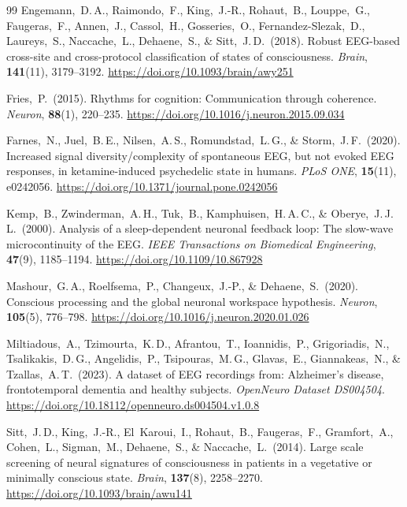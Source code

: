 \documentclass[11pt,a4paper]{article}
\theoremstyle{plain}
\theoremstyle{definition}
\theoremstyle{remark}
\begin{document}
\begin{thebibliography}{99}
Engemann,~D.\,A., Raimondo,~F., King,~J.-R., Rohaut,~B., Louppe,~G., Faugeras,~F., Annen,~J., Cassol,~H., Gosseries,~O., Fernandez-Slezak,~D., Laureys,~S., Naccache,~L., Dehaene,~S., \& Sitt,~J.\,D.\ (2018).
Robust EEG-based cross-site and cross-protocol classification of states of consciousness.
\textit{Brain}, \textbf{141}(11), 3179--3192.
\url{https://doi.org/10.1093/brain/awy251}

Fries,~P.\ (2015).
Rhythms for cognition: Communication through coherence.
\textit{Neuron}, \textbf{88}(1), 220--235.
\url{https://doi.org/10.1016/j.neuron.2015.09.034}

Farnes,~N., Juel,~B.\,E., Nilsen,~A.\,S., Romundstad,~L.\,G., \& Storm,~J.\,F.\ (2020).
Increased signal diversity/complexity of spontaneous EEG, but not evoked EEG responses, in ketamine-induced psychedelic state in humans.
\textit{PLoS ONE}, \textbf{15}(11), e0242056.
\url{https://doi.org/10.1371/journal.pone.0242056}


Kemp,~B., Zwinderman,~A.\,H., Tuk,~B., Kamphuisen,~H.\,A.\,C., \& Oberye,~J.\,J.\,L.\ (2000).
Analysis of a sleep-dependent neuronal feedback loop: The slow-wave microcontinuity of the EEG.
\textit{IEEE Transactions on Biomedical Engineering}, \textbf{47}(9), 1185--1194.
\url{https://doi.org/10.1109/10.867928}

Mashour,~G.\,A., Roelfsema,~P., Changeux,~J.-P., \& Dehaene,~S.\ (2020).
Conscious processing and the global neuronal workspace hypothesis.
\textit{Neuron}, \textbf{105}(5), 776--798.
\url{https://doi.org/10.1016/j.neuron.2020.01.026}

Miltiadous,~A., Tzimourta,~K.\,D., Afrantou,~T., Ioannidis,~P., Grigoriadis,~N., Tsalikakis,~D.\,G., Angelidis,~P., Tsipouras,~M.\,G., Glavas,~E., Giannakeas,~N., \& Tzallas,~A.\,T.\ (2023).
A dataset of EEG recordings from: Alzheimer's disease, frontotemporal dementia and healthy subjects.
\textit{OpenNeuro Dataset DS004504}.
\url{https://doi.org/10.18112/openneuro.ds004504.v1.0.8}


Sitt,~J.\,D., King,~J.-R., El~Karoui,~I., Rohaut,~B., Faugeras,~F., Gramfort,~A., Cohen,~L., Sigman,~M., Dehaene,~S., \& Naccache,~L.\ (2014).
Large scale screening of neural signatures of consciousness in patients in a vegetative or minimally conscious state.
\textit{Brain}, \textbf{137}(8), 2258--2270.
\url{https://doi.org/10.1093/brain/awu141}



\end{thebibliography}
\end{document}
